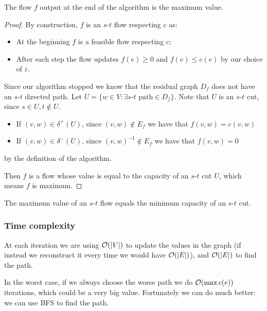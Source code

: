 \documentclass[14pt]{extarticle}
\begin{document}
\begin{theorem}
    The flow $f$ output at the end of the algorithm is the maximum value.
\end{theorem}

\begin{proof}
    By construction, $f$ is an $s$-$t$ flow respecting $c$ as:
    \begin{itemize}
        \item At the beginning $f$ is a feasible flow respecting $c$;
        \item After each step the flow updates $f(e) \geq 0$ and $f(e) \leq c(e)$ by our choice of $\varepsilon$.
    \end{itemize}

    Since our algorithm stopped we know that the residual graph $D_f$ does not have an $s$-$t$ directed path.
    Let $U = \{ w \in V: \exists s\text{-}t \text{ path} \in D_f \}$.
    Note that $U$ is an $s$-$t$ cut, since $s \in U, t \notin U$.
    \begin{itemize}
        \item If $(v, w) \in \delta^+(U)$, since $(v, w) \notin E_f$ we have that $f(v, w) = c(v, w)$
        \item If $(v, w) \in \delta^-(U)$, since $(v, w)^{-1} \notin E_f$ we have that $f(v, w) = 0$
    \end{itemize}
    by the definition of the algorithm.

    Then $f$ is a flow whose value is equal to the capacity of an $s$-$t$ cut $U$, which means $f$ is maximum.
\end{proof}

\begin{corollary}
    The maximum value of an $s$-$t$ flow equals the minimum capacity of an $s$-$t$ cut.
\end{corollary}

\subsubsection{Time complexity}
\label{sec:flow:time_complexity}

At each iteration we are using $\mathcal{O}(\abs{V})$ to update the values in the graph (if instead we reconstruct it every time we would have $\mathcal{O}(\abs{E})$), and $\mathcal{O}(\abs{E})$ to find the path.

In the worst case, if we always choose the worse path we do $\mathcal{O}(\max{c(e)})$ iterations, which could be a very big value.
Fortunately we can do much better: we can use BFS to find the path.
\end{document}
